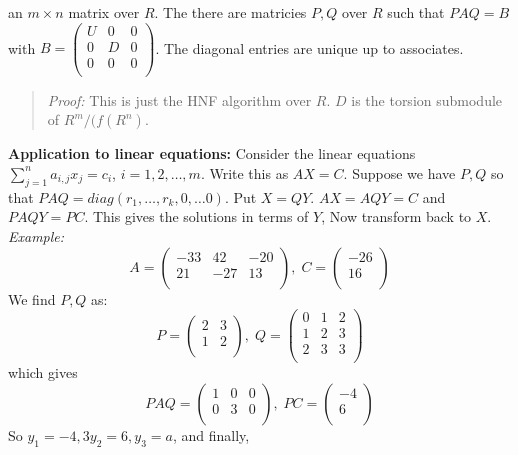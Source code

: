 an $m \times n$ matrix over $R$.  The there are matricies $P,Q$ over $R$ such that
$PAQ= B$ with $B= 
\left(
\begin{array}{ccc}
U & 0 & 0\\
0 & D & 0\\
0 & 0 & 0\\
\end{array}
\right) $.  The diagonal entries are unique up to associates.
\begin{quote}
\emph{Proof:}
This is just the HNF algorithm over $R$.  $D$ is the torsion submodule of $R^m/(f(R^n)$.
\end{quote}
{\bf Application to linear equations:} Consider the linear equations $\sum_{j=1}^n a_{i,j} x_j =c_i$, $i= 1, 2, \ldots, m$.  Write this as
$AX=C$.  Suppose  we have $P, Q$ so that $PAQ= diag(r_1, \ldots, r_k, 0, \ldots 0)$.  Put $X= QY$.  $AX= AQY=C$ and $PAQY=PC$. This gives
the solutions in terms of $Y$,  Now transform back to $X$.\\
\emph{Example:}
$$
A=
\left(
\begin{array}{ccc}
-33 & 42 & -20 \\
21 & -27 & 13\\
\end{array}
\right) , \;
C=
\left(
\begin{array}{c}
-26\\
16\\
\end{array}
\right)
$$
We find $P, Q$ as:
$$
P=
\left(
\begin{array}{cc}
2 & 3 \\
1 & 2 \\
\end{array}
\right) , \;
Q=
\left(
\begin{array}{ccc}
0 & 1 & 2\\
1 & 2& 3\\
2 & 3& 3\\
\end{array}
\right)
$$
which gives
$$
PAQ=
\left(
\begin{array}{ccc}
1 & 0 & 0\\
0 & 3 & 0\\
\end{array}
\right),\;
PC = 
\left(
\begin{array}{c}
-4\\
6\\
\end{array}
\right)
$$
So $y_1 = -4,3 y_2=6, y_3=a$, and finally,
